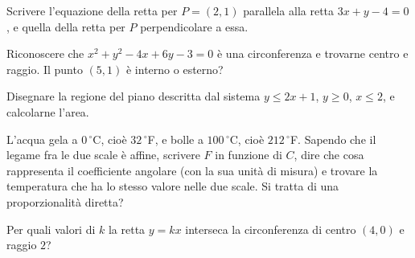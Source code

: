 \begin{esercizio}[\liv{1}]
Scrivere l'equazione della retta per $P=(2,1)$ parallela alla retta $3x+y-4=0$, e quella della retta per $P$ perpendicolare a essa.
\end{esercizio}

\begin{esercizio}[\liv{2}]
Riconoscere che $x^2+y^2-4x+6y-3=0$ è una circonferenza e trovarne centro e raggio. Il punto $(5,1)$ è interno o esterno?
\end{esercizio}

\begin{esercizio}[\liv{2}]
Disegnare la regione del piano descritta dal sistema $y\le2x+1$, $y\ge0$, $x\le2$, e calcolarne l'area.
\end{esercizio}

\begin{esercizio}[\liv{2}]
L'acqua gela a $0\,^\circ$C, cioè $32\,^\circ$F, e bolle a $100\,^\circ$C, cioè $212\,^\circ$F. Sapendo che il legame fra le due scale è affine, scrivere $F$ in funzione di $C$, dire che cosa rappresenta il coefficiente angolare (con la sua unità di misura) e trovare la temperatura che ha lo stesso valore nelle due scale. Si tratta di una proporzionalità diretta?
\end{esercizio}

\begin{esercizio}[\liv{3}]
Per quali valori di $k$ la retta $y=kx$ interseca la circonferenza di centro $(4,0)$ e raggio $2$?
\end{esercizio}


